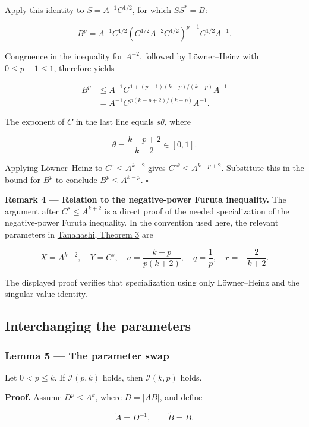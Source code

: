 \documentclass[10pt,a4paper]{article}
\begin{document}
Apply this identity to \(S=A^{-1}C^{1/2}\), for which \(SS^*=B\):

\[
B^p=A^{-1}C^{1/2}
(C^{1/2}A^{-2}C^{1/2})^{p-1}
C^{1/2}A^{-1}.
\]

Congruence in the inequality for \(A^{-2}\), followed by Löwner--Heinz
with \(0\le p-1\le1\), therefore yields

\[
\begin{aligned}
B^p
&\le A^{-1}C^{\,1+(p-1)(k-p)/(k+p)}A^{-1}\\
&=A^{-1}C^{\,p(k-p+2)/(k+p)}A^{-1}.
\end{aligned}
\]

The exponent of \(C\) in the last line equals \(s\theta\), where

\[
\theta=\frac{k-p+2}{k+2}\in[0,1].
\]

Applying Löwner--Heinz to \(C^s\le A^{k+2}\) gives
\(C^{s\theta}\le A^{k-p+2}\). Substitute this in the bound for \(B^p\)
to conclude \(B^p\le A^{k-p}\). \(\square\)

\textbf{Remark 4 --- Relation to the negative-power Furuta inequality.}
The argument after \(C^s\le A^{k+2}\) is a direct proof of the needed
specialization of the negative-power Furuta inequality. In the
convention used here, the relevant parameters in
\href{https://www.researchgate.net/publication/255605812_The_Furuta_inequality_with_negative_powers}{Tanahashi,
Theorem 3} are

\[
X=A^{k+2},\quad Y=C^s,\quad
a=\frac{k+p}{p(k+2)},\quad q=\frac1p,\quad r=-\frac2{k+2}.
\]

The displayed proof verifies that specialization using only
Löwner--Heinz and the singular-value identity.

\subsection{Interchanging the
parameters}\label{interchanging-the-parameters}

\subsubsection{Lemma 5 --- The parameter
swap}\label{lemma-5-the-parameter-swap}

Let \(0<p\le k\). If \(\mathcal I(p,k)\) holds, then \(\mathcal I(k,p)\)
holds.

\textbf{Proof.} Assume \(D^p\le A^k\), where \(D=|AB|\), and define

\[
\widetilde A=D^{-1},\qquad \widetilde B=B.
\]
\end{document}
